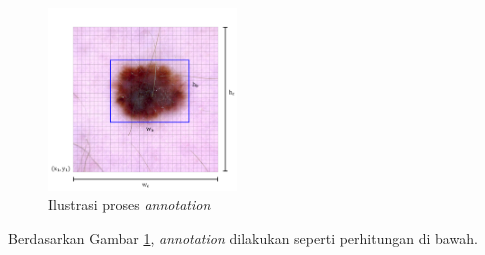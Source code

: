     \begin{figure}[H]
        \centering
            \includegraphics[width=5cm]{img/bab4/annotation.png}
        \caption{Ilustrasi proses \textit{annotation}}
        \label{fig:d-annotation}
    \end{figure}

    Berdasarkan Gambar \ref{fig:d-annotation}, \textit{annotation} dilakukan seperti perhitungan di bawah.


